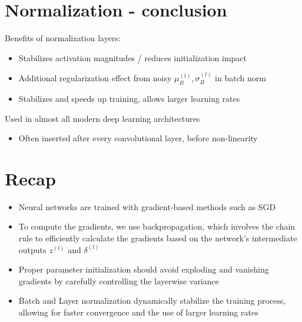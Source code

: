\section*{Normalization - conclusion}
Benefits of normalization layers:

\begin{itemize}
  \item Stabilizes activation magnitudes / reduces initialization impact
  \item Additional regularization effect from noisy $\mu_{B}^{(l)}, \sigma_{B}^{(l)}$ in batch norm
  \item Stabilizes and speeds up training, allows larger learning rates
\end{itemize}

Used in almost all modern deep learning architectures

\begin{itemize}
  \item Often inserted after every convolutional layer, before non-linearity
\end{itemize}

\section*{Recap}
\begin{itemize}
  \item Neural networks are trained with gradient-based methods such as SGD

  \item To compute the gradients, we use backpropagation, which involves the chain rule to efficiently calculate the gradients based on the network's intermediate outputs $z^{(l)}$ and $\delta^{(l)}$

  \item Proper parameter initialization should avoid exploding and vanishing gradients by carefully controlling the layerwise variance

  \item Batch and Layer normalization dynamically stabilize the training process, allowing for faster convergence and the use of larger learning rates

\end{itemize}